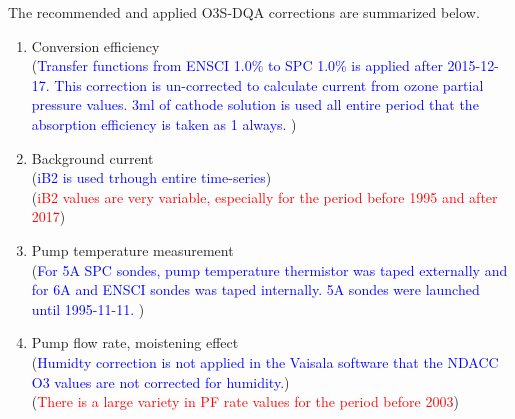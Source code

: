 The recommended and applied O3S-DQA corrections are summarized below.
    \begin{enumerate}
        \item Conversion efficiency \\
         (\textcolor{blue}{Transfer functions from ENSCI 1.0\% to SPC 1.0\%
        is applied after 2015-12-17. This correction is un-corrected to calculate current from ozone partial
        pressure values. 3ml of cathode solution is used all entire period that the absorption efficiency is taken as 1 always.
 })
        \item Background current\\
        (\textcolor{blue}{iB2 is used trhough entire time-series})\\
        (\textcolor{red}{iB2 values are very variable, especially for the period before 1995 and after 2017})\\
        \item Pump temperature measurement\\
        (\textcolor{blue}{For 5A SPC sondes, pump temperature thermistor was taped externally and for 6A and ENSCI sondes
        was taped internally. 5A sondes were launched until 1995-11-11. })\\
        \item Pump flow rate, moistening effect\\
                (\textcolor{blue}{Humidty correction is not applied in the Vaisala software that the NDACC O3 values are
                not corrected for humidity.})\\
        (\textcolor{red}{There is a large variety in PF rate values for the period before 2003})\\


\end{enumerate}
